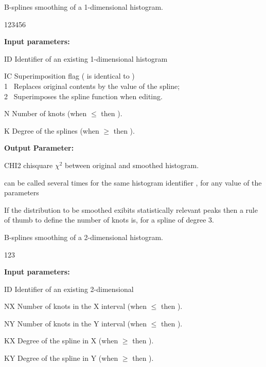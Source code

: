  
\Action
B-splines smoothing of a 1-dimensional histogram.
 
\begin{DLtt}{123456}
\item[{\rm\bf Input parameters:}]
\item[ID] Identifier of an existing 1-dimensional histogram
\item[IC] Superimposition flag ( is identical to )\\
1 \  Replaces original contents by the value of the spline;\\
2 \  Superimposes the spline function when editing.
\item[N] Number of knots (when \(\le\) then ).
\item[K] Degree of the splines (when \(\ge\) then ).
\item[{\rm\bf Output Parameter:}]
\item[CHI2] chisquare $\chi^2$ between original and smoothed histogram.
\end{DLtt}
 
\Remarks
\begin{UL}
\item {} can be called several times for the same
histogram identifier , for any value of the parameters
\item If the distribution to be smoothed exibits 
statistically relevant peaks then a rule of thumb to define the
number of knots is,  for a spline of degree 3.
\end{UL}
 

 
\Action
B-splines smoothing of a 2-dimensional histogram.
 
\begin{DLtt}{123}
\item[{\rm\bf Input parameters:}]
\item[ID] Identifier of an existing 2-dimensional
\item[NX] Number of knots in the X interval (when \(\le\) then ).
\item[NY] Number of knots in the Y interval (when \(\le\) then ).
\item[KX] Degree of the spline in X (when \(\ge\)
 then ).
\item[KY] Degree of the spline in Y (when \(\ge\)
 then ).
\end{DLtt}
 
